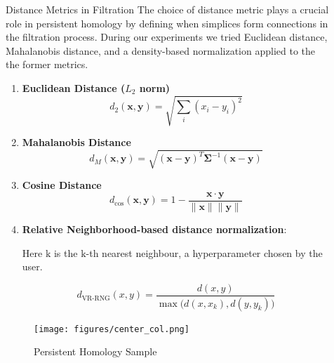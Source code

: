 \documentclass[final]{beamer}
\newlength{\sepwidth}
\newlength{\colwidth}
\newcommand{\separatorcolumn}{\begin{column}{\sepwidth}\end{column}}
\begin{document}
\begin{frame}[t]
\begin{columns}[t]
\begin{column}{\colwidth}
  \end{column}

\separatorcolumn
\begin{column}{\colwidth}

  \begin{block}{Distance Metrics in Filtration}
    The choice of distance metric plays a crucial role in persistent homology by defining when simplices form connections in the filtration process. During our experiments we tried Euclidean distance, Mahalanobis distance, and a density-based normalization applied to the the former metrics.

      \begin{enumerate}
          \item \textbf{Euclidean Distance (\(L_2\) norm)}
                \[
                d_2(\mathbf{x}, \mathbf{y}) = \sqrt{\sum_{i} (x_i - y_i)^2}
                \]

          \item \textbf{Mahalanobis Distance}
                \[
                d_M(\mathbf{x}, \mathbf{y}) = \sqrt{(\mathbf{x} - \mathbf{y})^T \mathbf{\Sigma}^{-1} (\mathbf{x} - \mathbf{y})}
                \]

          \item \textbf{Cosine Distance}
            \[
            d_{\text{cos}}(\mathbf{x}, \mathbf{y}) = 1 - \frac{\mathbf{x} \cdot \mathbf{y}}{\|\mathbf{x}\| \|\mathbf{y}\|}
            \]

          \item \textbf{Relative Neighborhood-based distance normalization}: 

            Here $\mathrm{k}$ is the $\mathrm{k}$-th nearest neighbour, a hyperparameter chosen by the user.
          
            \[
            d_{\text{VR-RNG}}(x, y) = \frac{d(x,y)}{\max \big( d(x, x_k), d(y, y_k) \big)}
            \]

           
       \end{enumerate}

       \begin{figure}[h!]
           \centering
           \texttt{[image: figures/center\_col.png]}
           \caption{Persistent Homology Sample}
       \end{figure}
  \end{block}




\end{column}
\end{columns}
\end{frame}
\end{document}
